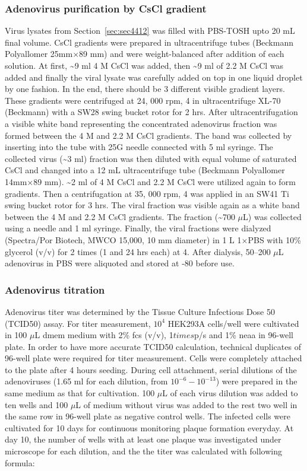 \subsubsection{Adenovirus purification by CsCl gradient}
Virus lysates from Section~\ref{sec:sec4412} was filled with PBS-TOSH upto 20 mL final volume. CsCl gradients were prepared in ultracentrifuge tubes (Beckmann Polyallomer 25mm$\times$89 mm) and were weight-balanced after addition of each solution. At first, \textasciitilde9 ml 4 M CsCl was added, then \textasciitilde9 ml of 2.2 M CsCl was added and finally the viral lysate was carefully added on top in one liquid droplet by one fashion. In the end, there should be 3 different visible gradient layers. These gradients were centrifuged at 24, 000 rpm, 4{\celsius} in ultracentrifuge XL-70 (Beckmann) with a SW28 swing bucket rotor for 2 hrs. After ultracentrifugation a visible white band representing the concentrated adenovirus fraction was formed between the 4 M and 2.2 M CsCl gradients. The band was collected by inserting into the tube with 25G needle connected with 5 ml syringe. The collected virus (\textasciitilde{}3 ml) fraction was then diluted with equal volume of saturated CsCl and changed into a 12 mL ultracentrifuge tube (Beckmann Polyallomer 14mm$\times$89 mm). \textasciitilde2 ml of 4 M CsCl and 2.2 M CsCl were utilized again to form gradients. Then a centrifugation at 35, 000 rpm, 4{\celsius} was applied in an SW41 Ti swing bucket rotor for 3 hrs. The viral fraction was visible again as a white band between the 4 M and 2.2 M CsCl gradients. The fraction (\textasciitilde{}700 $\mu$L) was collected using a needle and 1 ml syringe. Finally, the viral fractions were dialyzed (Spectra{\slash}Por\textsuperscript{\textregistered} Biotech, MWCO 15,000, 10 mm diameter) in 1 L 1$\times$PBS with 10\% glycerol (v{\slash}v) for 2 times (1 and 24 hrs each) at 4{\celsius}. After dialysis, 50--200 $\mu$L adenovirus in PBS were aliquoted and stored at -80{\celsius} before use.

\subsubsection{Adenovirus titration}
Adenovirus titer was determined by the Tissue Culture Infectious Dose 50 (TCID50) assay. For titer measurement, $10^{4}$ HEK293A cells/well were cultivated in 100 $\mu$L \gls{dmem} medium with 2\% \gls{fcs} (v{\slash}v), 1$times$\gls{p/s} and 1\% \gls{neaa} in 96-well plate. In order to have more accurate TCID50 calculation, technical duplicates of 96-well plate were required for titer measurement. Cells were completely attached to the plate after 4 hours seeding. During cell attachment, serial dilutions of the adenoviruses (1.65 ml for each dilution, from $10^{-6} - 10^{-13}$) were prepared in the same medium as that for cultivation. 100 $\mu$L of each virus dilution was added to ten wells and 100 $\mu$L of medium without virus was added to the rest two well in the same row in 96-well plate as negative control wells. The infected cells were cultivated for 10 days for continuous monitoring plaque formation everyday. At day 10, the number of wells with at least one plaque was investigated under microscope for each dilution, and the the titer was calculated with following formula:

